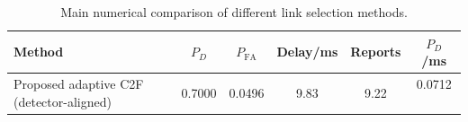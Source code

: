 \begin{table}[t]
    \centering
    \caption{Main numerical comparison of different link selection methods.}
    \label{tab:main_summary}
    \begin{tabular}{l c c c c c}
        \hline
        Method & $P_D$ & $P_{\mathrm{FA}}$ & Delay/ms & Reports & $P_D$/ms \\
        \hline
        Proposed adaptive C2F (detector-aligned) & 0.7000 & 0.0496 & 9.83 & 9.22 & 0.0712 \
        \hline
    \end{tabular}
\end{table}
